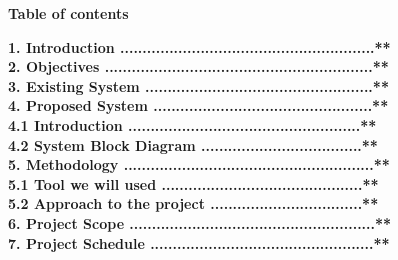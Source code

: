 \documentclass[a4paper]{article}
\begin{document}
\newpage
{


	\begin{center}
		\textbf{ \huge{Table of contents}}
		\vspace{40pt}
	\end{center}


	\vspace{20pt}

\Large{

	\textbf{1. Introduction	.........................................................** \\ }
	\vspace{20pt}
	\textbf{2. Objectives  ............................................................**\\}
	\vspace{20pt}
	\textbf{3. Existing System ...................................................**\\}
	\vspace{20pt}
	\textbf{4. Proposed System .................................................**\\}
	\vspace{20pt}
	\hspace{15pt}\textbf{4.1 Introduction ....................................................** \\}
	\vspace{20pt}
	\hspace{15pt}\textbf{4.2 System Block Diagram ....................................** \\}
	\vspace{20pt}
	\textbf{5. Methodology ........................................................**\\}
	\vspace{20pt}
	\hspace{15pt}\textbf{5.1 Tool we will used .............................................** \\}
	\vspace{20pt}
	\hspace{15pt}\textbf{5.2 Approach to the project ..................................**  \\}
	\vspace{20pt}
	\textbf{6. Project Scope .......................................................** \\}
	\vspace{20pt}
	\textbf{7. Project Schedule ..................................................**}		
	\vspace{20pt}

}

}
\end{document}
